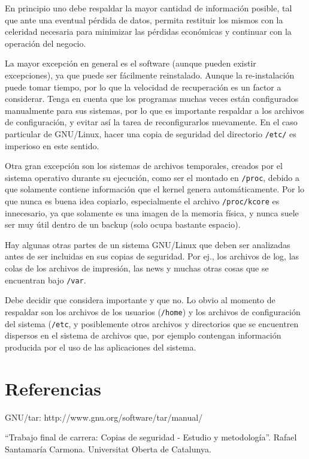 \documentclass[12pt]{article}
\begin{document}
En principio uno debe respaldar la mayor cantidad de información posible, 
tal que ante una eventual pérdida de datos, permita restituir los mismos 
con la celeridad necesaria para minimizar las pérdidas económicas y 
continuar con la operación del negocio. 

La mayor excepción en general es el software (aunque pueden existir 
excepciones), ya que puede ser fácilmente reinstalado. Aunque la 
re-instalación puede tomar tiempo, por lo que la velocidad de recuperación
es un factor a considerar. 
Tenga en cuenta que los programas muchas veces están configurados 
manualmente para sus sistemas, por lo que es importante respaldar a los 
archivos de configuración, y evitar así la tarea de reconfigurarlos 
nuevamente. En el caso particular de GNU/Linux, hacer una copia de
seguridad del directorio {\tt /etc/} es imperioso en este sentido.

Otra gran excepción son los sistemas de archivos temporales, creados por 
el sistema operativo durante su ejecución, como ser el montado en 
\texttt{/proc}, debido a que solamente contiene información que el kernel
genera automáticamente. Por lo que nunca es buena idea copiarlo, 
especialmente el archivo \texttt{/proc/kcore} es innecesario, ya que 
solamente es una imagen de la memoria física, y nunca suele ser muy útil 
dentro de un backup (solo ocupa bastante espacio).
	
Hay algunas otras partes de un sistema GNU/Linux que deben ser analizadas
 antes de ser incluidas en sus copias de seguridad. Por ej., los archivos 
de log, las colas de los archivos de impresión, las news y muchas otras 
cosas que se encuentran bajo \texttt{/var}. 

Debe decidir que considera importante y que no.  Lo obvio al momento de 
respaldar son los archivos de los usuarios (\texttt{/home}) y los archivos
de configuración del sistema (\texttt{/etc}, y posiblemente otros archivos
y directorios que se encuentren dispersos en el sistema de archivos que, 
por ejemplo contengan información producida por el uso de las aplicaciones
del sistema.



\section*{Referencias}

GNU/tar: http://www.gnu.org/software/tar/manual/

``Trabajo final de carrera: Copias de seguridad - Estudio y metodología''.
Rafael Santamaría Carmona. Universitat Oberta de Catalunya.


\end{document}
